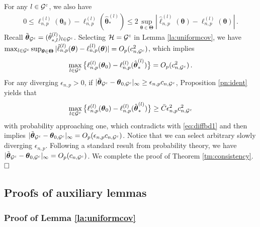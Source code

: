 \documentclass[10pt,a4paper]{amsart}
\theoremstyle{plain}
\theoremstyle{remark}
\newcommand{\btheta}{\boldsymbol \theta}
\newcommand{\bTheta}{\boldsymbol \Theta}
\newcommand{\btc}{{\rm c}}
\def\T{{\scriptscriptstyle \top} }
\begin{document}
For any $l\in\mathcal{G}^{\btc}$, %
we also have 
\begin{align*}%
0\leq {\ell}_{n,p}^{(l)}(\btheta_0)-{\ell}_{n,p}^{(l)}(\hat{\btheta}_*^{(l)})\leq 2\sup_{\btheta\in\bTheta}|\hat{\ell}_{n,p}^{(l)}(\btheta)-{\ell}_{n,p}^{(l)}(\btheta)|\,.
\end{align*}
Recall $\tilde{\btheta}_{\mathcal{G}^{\btc}}=(\hat{\theta}_{*,l}^{(l)})_{l\in\mathcal{G}^{\btc}}$. Selecting $\mathcal{H}=\mathcal{G}^{\btc}$ in Lemma \ref{la:uniformcov}, we have $\max_{l\in\mathcal{G}^{\btc}}\sup_{\btheta\in\bTheta}|\hat{\ell}_{n,p}^{(l)}(\btheta)-{\ell}_{n,p}^{(l)}(\btheta)|=O_{\rm p}(c_{n,\mathcal{G}^{\btc}}^2)$, which implies 
\begin{align}\label{eq:diffbd1}
\max_{l\in\mathcal{G}^{\btc}}\big\{{\ell}_{n,p}^{(l)}(\btheta_0)-{\ell}_{n,p}^{(l)}(\hat{\btheta}_*^{(l)})\big\}=O_{\rm p}(c_{n,\mathcal{G}^{\btc}}^2)\,.
\end{align}
For any diverging $\epsilon_{n,p}>0$, if $|\tilde{\btheta}_{\mathcal{G}^{\btc}}-\btheta_{0,\mathcal{G}^{\btc}}|_\infty\geq \epsilon_{n,p}c_{n,\mathcal{G}^{\btc}}$, Proposition \ref{pn:ident} yields that
\[
\max_{l\in\mathcal{G}^{\btc}}\big\{{\ell}_{n,p}^{(l)}(\btheta_0)-{\ell}_{n,p}^{(l)}(\hat{\btheta}_*^{(l)})\big\}\geq\bar{C}\epsilon_{n,p}^2c_{n,\mathcal{G}^{\btc}}^2 
\]
with probability approaching one, which contradicts with \eqref{eq:diffbd1} and then implies $|\tilde{\btheta}_{\mathcal{G}^{\btc}}-\btheta_{0,\mathcal{G}^{\btc}}|_\infty=O_{\rm p}( \epsilon_{n,p}c_{n,\mathcal{G}^{\btc}})$. Notice that we can select arbitrary slowly diverging $\epsilon_{n,p}$. Following a standard result from
probability theory, we have $|\tilde{\btheta}_{\mathcal{G}^{\btc}}-\btheta_{0,\mathcal{G}^{\btc}}|_\infty=O_{\rm p}(c_{n,\mathcal{G}^{\btc}})$. We complete the proof of Theorem \ref{tm:consistency}.  $\hfill\Box$

\subsection{Proofs of auxiliary lemmas}

\subsubsection{Proof of Lemma \ref{la:uniformcov}}\label{sec:pflauniformcov}
\end{document}
